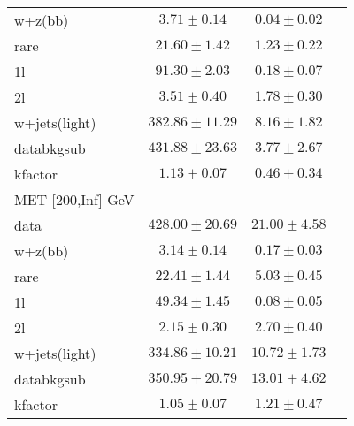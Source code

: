 \begin{table}
\begin{center}
\begin{tabular}{lccc}
\hline
w+z(bb)&$3.71\pm0.14$&$0.04\pm0.02$\\
rare&$21.60\pm1.42$&$1.23\pm0.22$\\
1l&$91.30\pm2.03$&$0.18\pm0.07$\\
2l&$3.51\pm0.40$&$1.78\pm0.30$\\
w+jets(light)&$382.86\pm11.29$&$8.16\pm1.82$\\
\hline
databkgsub&$431.88\pm23.63$&$3.77\pm2.67$\\
kfactor&$1.13\pm0.07$&$0.46\pm0.34$\\
\hline\hline
\hline
MET [200,Inf] GeV & &\\
\hline
data&$428.00\pm20.69$&$21.00\pm4.58$\\
\hline
w+z(bb)&$3.14\pm0.14$&$0.17\pm0.03$\\
rare&$22.41\pm1.44$&$5.03\pm0.45$\\
1l&$49.34\pm1.45$&$0.08\pm0.05$\\
2l&$2.15\pm0.30$&$2.70\pm0.40$\\
w+jets(light)&$334.86\pm10.21$&$10.72\pm1.73$\\
\hline
databkgsub&$350.95\pm20.79$&$13.01\pm4.62$\\
kfactor&$1.05\pm0.07$&$1.21\pm0.47$\\
\hline\hline
\hline
\end{tabular}
\end{center}
\end{table}
